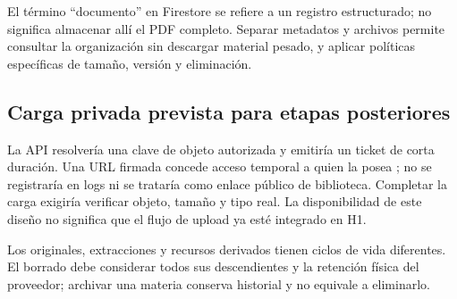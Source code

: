 El término ``documento'' en Firestore se refiere a un registro estructurado; no significa almacenar allí el PDF completo. Separar metadatos y archivos permite consultar la organización sin descargar material pesado, y aplicar políticas específicas de tamaño, versión y eliminación.

\subsection{Carga privada prevista para etapas posteriores}
La API resolvería una clave de objeto autorizada y emitiría un ticket de corta duración. Una URL firmada concede acceso temporal a quien la posea \cite{signed-url}; no se registraría en logs ni se trataría como enlace público de biblioteca. Completar la carga exigiría verificar objeto, tamaño y tipo real. La disponibilidad de este diseño no significa que el flujo de upload ya esté integrado en H1.

Los originales, extracciones y recursos derivados tienen ciclos de vida diferentes. El borrado debe considerar todos sus descendientes y la retención física del proveedor; archivar una materia conserva historial y no equivale a eliminarlo.
